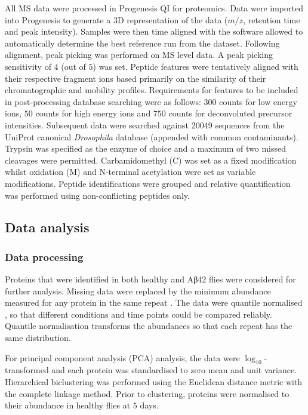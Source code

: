 All MS data were processed in Progenesis QI for proteomics.
Data were imported into Progenesis to generate a $3$D representation of the data ($m/z$, retention time and peak intensity).
Samples were then time aligned with the software allowed to automatically determine the best reference run from the dataset.
Following alignment, peak picking was performed on MS level data. A peak picking sensitivity of $4$ (out of $5$) was set.
Peptide features were tentatively aligned with their respective fragment ions based primarily on the similarity of their chromatographic and mobility profiles.
Requirements for features to be included in post-processing database searching were as follows: $300$ counts for low energy ions, $50$ counts for high energy ions and $750$ counts for deconvoluted precursor intensities.
Subsequent data were searched against \num{20049} sequences from the UniProt canonical \textit{Drosophila} database (appended with common contaminants).
Trypsin was specified as the enzyme of choice and a maximum of two missed cleavages were permitted.
Carbamidomethyl (C) was set as a fixed modification whilst oxidation (M) and N-terminal acetylation were set as variable modifications.
Peptide identifications were grouped and relative quantification was performed using non-conflicting peptides only.

\subsection{Data analysis}

\subsubsection{Data processing}

Proteins that were identified in both healthy and Aβ42 flies were considered for further analysis.
Missing data were replaced by the minimum abundance measured for any protein in the same repeat \cite{Lazar2016a}.
The data were quantile normalised \cite{Bolstad2003}, so that different conditions and time points could be compared reliably.
Quantile normalisation transforms the abundances so that each repeat has the same distribution.

For principal component analysis (PCA) analysis, the data were $\log_{10}$-transformed and each protein was standardised to zero mean and unit variance.
Hierarchical biclustering was performed using the Euclidean distance metric with the complete linkage method.
Prior to clustering, proteins were normalised to their abundance in healthy flies at $5$ days.

